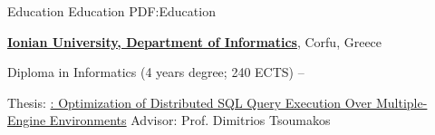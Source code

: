 
\Section
{Education}
{Education}
{PDF:Education}

\Entry
\href{http://www.ionio.gr}
{\textbf{Ionian University, Department of Informatics}},
Corfu, Greece

\Gap
\BulletItem
Diploma in Informatics (4 years degree; 240 ECTS)
\hfill
{} --
\begin{Detail}
\SubBulletItem
Thesis:
\href{http://www.cslab.ece.ntua.gr/~vgian/papers/thesis.pdf}
{: Optimization of Distributed SQL Query Execution Over Multiple-Engine Environments}
\SubBulletItem
Advisor:
Prof. Dimitrios Tsoumakos
\end{Detail}
